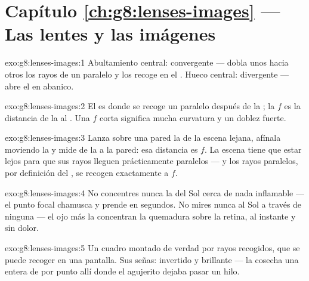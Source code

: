 \section*{Capítulo \ref{ch:g8:lenses-images} --- Las lentes y las imágenes}

\begin{solution}{exo:g8:lenses-images:1}
Abultamiento central: convergente --- dobla unos hacia otros los rayos
de un  paralelo y los recoge en el . Hueco central:
divergente --- abre el  en abanico.
\end{solution}

\begin{solution}{exo:g8:lenses-images:2}
El  es donde se recoge un  paralelo después de
la ; la  $f$ es la distancia de la
 al . Una $f$ corta significa mucha curvatura y un doblez
fuerte.
\end{solution}

\begin{solution}{exo:g8:lenses-images:3}
Lanza sobre una pared la  de la escena lejana, afínala
moviendo la  y mide de la  a la pared: esa
distancia es $f$. La escena tiene que estar lejos para que sus rayos
lleguen prácticamente paralelos --- y los rayos paralelos, por
definición del , se recogen exactamente a $f$.
\end{solution}

\begin{solution}{exo:g8:lenses-images:4}
No concentres nunca la  del Sol cerca de nada inflamable --- el
punto focal chamusca y prende en segundos. No mires nunca al Sol a
través de ninguna  --- el ojo más la 
concentran la quemadura sobre la retina, al instante y sin dolor.
\end{solution}

\begin{solution}{exo:g8:lenses-images:5}
Un cuadro montado de verdad por rayos recogidos, que se puede recoger
en una pantalla. Sus señas: invertido y brillante --- la
 cosecha una  entera de  por punto allí
donde el agujerito dejaba pasar un hilo.
\end{solution}

